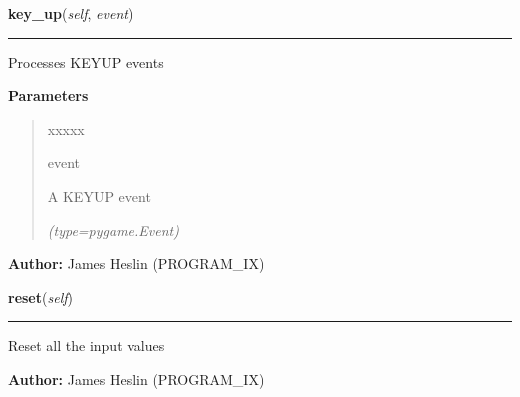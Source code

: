 \hspace{.8\funcindent}\begin{boxedminipage}{\funcwidth}

    \raggedright \textbf{key\_up}(\textit{self}, \textit{event})

    \vspace{-1.5ex}

    \rule{\textwidth}{0.5\fboxrule}
\setlength{\parskip}{2ex}
    Processes KEYUP events

\setlength{\parskip}{1ex}
      \textbf{Parameters}
      \vspace{-1ex}

      \begin{quote}
        \begin{Ventry}{xxxxx}

          \item[event]

          A KEYUP event

            {\it (type=pygame.Event)}

        \end{Ventry}

      \end{quote}

\textbf{Author:} James Heslin (PROGRAM\_IX)



    \end{boxedminipage}

    \label{pystroke:input_engine:InputEngine:reset}

    \vspace{0.5ex}

\hspace{.8\funcindent}\begin{boxedminipage}{\funcwidth}

    \raggedright \textbf{reset}(\textit{self})

    \vspace{-1.5ex}

    \rule{\textwidth}{0.5\fboxrule}
\setlength{\parskip}{2ex}
    Reset all the input values

\setlength{\parskip}{1ex}
\textbf{Author:} James Heslin (PROGRAM\_IX)



    \end{boxedminipage}

